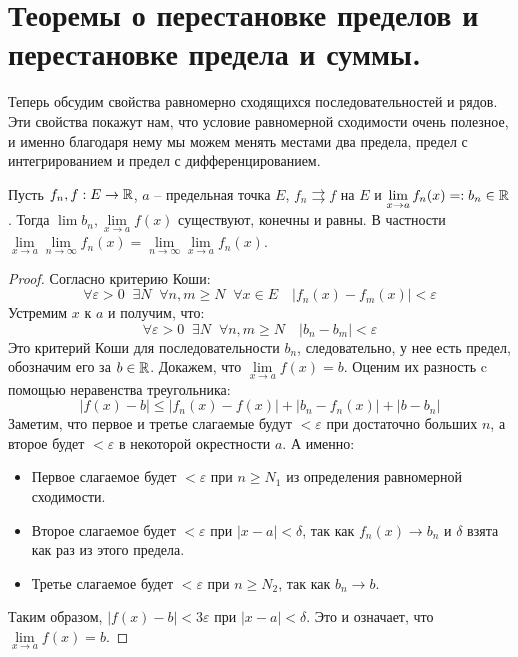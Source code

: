 \section{Теоремы о перестановке пределов и перестановке предела и суммы.}
Теперь обсудим свойства равномерно сходящихся последовательностей и рядов.
 Эти свойства покажут нам, что условие равномерной сходимости очень полезное, и именно благодаря нему мы можем менять местами два предела, предел с интегрированием и предел с дифференцированием.

\vspace*{5mm}

 \begin{theorem}
     Пусть $f_n, f : E \to \mathbb{R}$, $a$ -- предельная точка $E$, $f_n \rightrightarrows f$ на $E$ и $\lim\limits_{x \to a} f_n(x) =: b_n \in \mathbb{R}$. 
     Тогда $\lim b_n, \lim\limits_{x \to a} f(x)$ существуют, конечны и равны.
     В частности $\lim\limits_{x \to a} \lim\limits_{n \to \infty} f_n(x) =  \lim\limits_{n \to \infty} \lim\limits_{x \to a} f_n(x)$.
 \end{theorem}
 \begin{proof}
     Согласно критерию Коши: \[ \forall \varepsilon > 0 \;\; \exists N \;\; \forall n, m \geqslant N \;\; \forall x \in E \quad |f_n(x) - f_m(x)| < \varepsilon \]
     \quad Устремим $x$ к $a$ и получим, что: \[ \forall \varepsilon > 0 \;\; \exists N \;\; \forall n, m \geqslant N \quad |b_n - b_m| < \varepsilon  \]
     \quad Это критерий Коши для последовательности $b_n$, следовательно, у нее есть предел, обозначим его за $b \in \mathbb{R}$.
     Докажем, что $\lim\limits_{x \to a} f(x) = b$. Оценим их разность c помощью неравенства треугольника:
     \[ |f(x) - b| \leqslant |f_n(x) - f(x)| + |b_n - f_n(x)| + |b - b_n| \]
     \quad Заметим, что первое и третье слагаемые будут $< \varepsilon$ при достаточно больших $n$, а второе будет $< \varepsilon$ в некоторой окрестности $a$.
     А именно: \begin{itemize}
         \item Первое слагаемое будет $< \varepsilon$ при $n \geqslant N_1$ из определения равномерной сходимости. 
         \item Второе слагаемое будет $< \varepsilon$ при $|x - a| < \delta$, так как $f_n(x) \to b_n$ и $\delta$ взята как раз из этого предела.
         \item Третье слагаемое будет $< \varepsilon$ при $n \geqslant N_2$, так как $b_n \to b$.
     \end{itemize} 
     \quad Таким образом, $|f(x) - b| < 3\varepsilon$ при $|x - a| < \delta$. Это и означает, что $\lim\limits_{x \to a} f(x) = b$.
 \end{proof}

